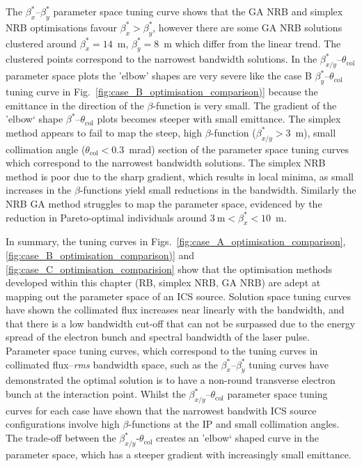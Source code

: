 \documentclass[../main.tex]{subfiles}
\begin{document}
The $\beta_{x}^{*}$--$\beta_{y}^{*}$ parameter space tuning curve shows that the GA NRB and simplex NRB optimisations favour $\beta_{x}^{*} > \beta_{y}^{*}$, however there are some GA NRB solutions clustered around $\beta_{x}^{*} = 14$~\si{\meter}, $\beta_{y}^{*} = 8$~\si{\meter} which differ from the linear trend. The clustered points correspond to the narrowest bandwidth solutions. In the $\beta_{x/y}^{*}$--$\theta_{\mathrm{col}}$ parameter space plots the 'elbow' shapes are very severe like the  case B $\beta_{y}^{*}$--$\theta_{\mathrm{col}}$ tuning curve in Fig.~\ref{fig:case_B_optimisation_comparison)} because the emittance in the direction of the $\beta$-function is very small. The gradient of the 'elbow` shape $\beta^{*}$--$\theta_{\mathrm{col}}$ plots becomes steeper with small emittance. The simplex method appears to fail to map the steep, high $\beta$-function ($\beta_{x/y}^{*} > 3$~\si{\meter}), small collimation angle ($\theta_{\mathrm{col}} < 0.3$~\si{\milli\radian}) section of the parameter space tuning curves which correspond to the narrowest bandwidth solutions. The simplex NRB method is poor due to the sharp gradient, which results in local minima, as small increases in the $\beta$-functions yield small reductions in the bandwidth. Similarly the NRB GA method struggles to map the parameter space, evidenced by the reduction in Pareto-optimal individuals around $3~\si{\meter} < \beta_{x}^{*} < 10$~\si{\meter}. 

In summary, the tuning curves in Figs.~\ref{fig:case_A_optimisation_comparison}, \ref{fig:case_B_optimisation_comparison)} and \ref{fig:case_C_optimisation_comparision} show that the optimisation methods developed within this chapter (RB, simplex NRB, GA NRB) are adept at mapping out the parameter space of an ICS source. Solution space tuning curves have shown the collimated flux increases near linearly with the  bandwidth, and that there is a low bandwidth cut-off that can not be surpassed due to the energy spread of the electron bunch and spectral bandwidth of the laser pulse. Parameter space tuning curves, which correspond to the tuning curves in collimated flux--\textit{rms} bandwidth space, such as the $\beta_{x}^{*}$--$\beta_{y}^{*}$ tuning curves have demonstrated the optimal solution is to have a non-round transverse electron bunch at the interaction point. Whilst the $\beta_{x/y}^{*}$--$\theta_{\mathrm{col}}$ parameter space tuning curves for each case have shown that the narrowest bandwith ICS source configurations involve high $\beta$-functions at the IP and small collimation angles. The trade-off between the $\beta_{x/y}^{*}$-$\theta_{\mathrm{col}}$ creates an 'elbow` shaped curve in the parameter space, which has a steeper gradient with increasingly small emittance.      
\end{document}
